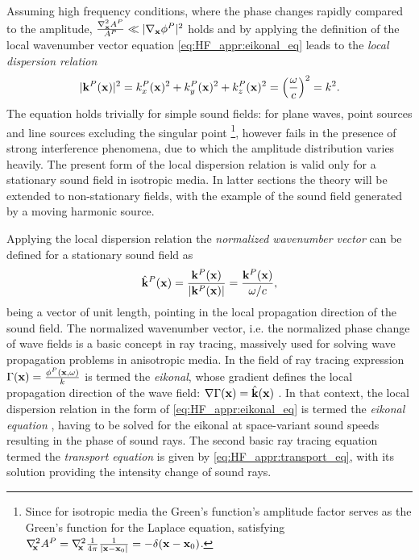 Assuming high frequency conditions, where the phase changes rapidly compared to the amplitude, $\frac{\nabla^2_{\mathbf{x}} A^P}{A^P} \ll | \nabla_{\mathbf{x}} \phi^P |^2$ holds
and by applying the definition of the local wavenumber vector equation \eqref{eq:HF_appr:eikonal_eq} leads to the \emph{local dispersion relation}
\begin{equation}
|\mathbf{k}^P(\mathbf{x})|^2 = k^P_x(\mathbf{x})^2 + k^P_y(\mathbf{x})^2 + k^P_z(\mathbf{x})^2 = \left( \frac{\omega}{c} \right)^2 = k^2.
\label{eq:HF_appr:local_dispersion}
\end{equation}
%
The equation holds trivially for simple sound fields: for plane waves, point sources and line sources excluding the singular point \footnote{Since for isotropic media the Green's function's amplitude factor serves as the Green's function for the Laplace equation, satisfying $\nabla^2_{\!\!\mathbf{x}} A^P = \nabla^2_{\!\!\mathbf{x}} \frac{1}{4\pi} \frac{1}{|\mathbf{x}-\mathbf{x}_0|} = -\delta(\mathbf{x}-\mathbf{x}_0)$.}, however fails in the presence of strong interference phenomena, due to which the amplitude distribution varies heavily.
The present form of the local dispersion relation is valid only for a stationary sound field in isotropic media.
In latter sections the theory will be extended to non-stationary fields, with the example of the sound field generated by a moving harmonic source.

Applying the local dispersion relation the \emph{normalized wavenumber vector} can be defined for a stationary sound field as
\begin{equation}
\hat{\mathbf{k}}^P(\mathbf{x}) = \frac{\mathbf{k}^P(\mathbf{x})}{|\mathbf{k}^P(\mathbf{x})|} = \frac{\mathbf{k}^P(\mathbf{x})}{\omega/c},
\end{equation}
being a vector of unit length, pointing in the local propagation direction of the sound field.
%
The normalized wavenumber vector, i.e. the normalized phase change of wave fields is a basic concept in ray tracing, massively used for solving wave propagation problems in anisotropic media.
In the field of ray tracing expression $\Gamma(\mathbf{x}) = \frac{\phi^P(\mathbf{x},\omega)}{k}$ is termed the \emph{eikonal}, whose gradient defines the local propagation direction of the wave field: $\nabla \Gamma(\mathbf{x}) = \hat{\mathbf{k}}(\mathbf{x})$ .
In that context, the local dispersion relation in the form of \eqref{eq:HF_appr:eikonal_eq} is termed the \emph{eikonal equation} \cite{Kinsler2000, Pierce1991}, having to be solved for the eikonal at space-variant sound speeds resulting in the phase of sound rays.
The second basic ray tracing equation termed the \emph{transport equation} is given by \eqref{eq:HF_appr:transport_eq}, with its solution providing the intensity change of sound rays.

